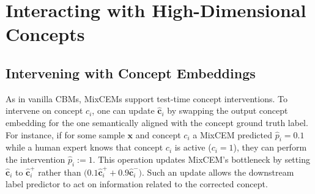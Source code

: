 \documentclass[withindex,glossary]{cam-thesis}
\theoremstyle{plain}
\theoremstyle{definition}
\theoremstyle{remark}
\begin{document}



\section{Interacting with High-Dimensional Concepts}

\subsection{Intervening with Concept Embeddings}
As in vanilla CBMs, MixCEMs support test-time concept interventions. To intervene on concept $c_i$, one can update $\hat{\mathbf{c}}_i$ by swapping the output concept embedding for the one semantically aligned with the concept ground truth label. For instance, if for some sample $\mathbf{x}$ and concept $c_i$ a MixCEM predicted $\hat{p}_i = 0.1$ while a human expert knows that concept $c_i$ is active ($c_i=1$), they can perform the intervention $\hat{p}_i := 1$. This operation updates MixCEM's bottleneck by setting $\hat{\mathbf{c}}_i$ to $\hat{\mathbf{c}}^+_i$ rather than $\big(0.1 \hat{\mathbf{c}}^+_i + 0.9 \hat{\mathbf{c}}^-_i\big)$. Such an update allows the downstream label predictor to act on information related to the corrected concept.
\end{document}
